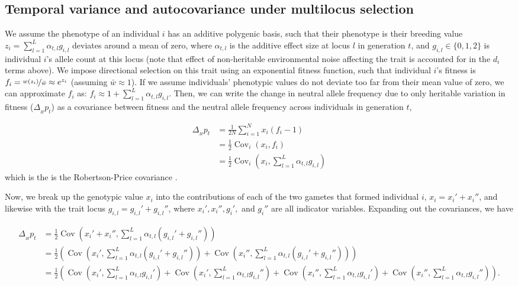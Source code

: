 \documentclass[11pt]{article}
\DeclareMathOperator{\cov}{Cov}
\begin{document}
\subsection{Temporal variance and autocovariance under multilocus selection}
\label{ap:multilocus}

We assume the phenotype of an individual $i$ has an additive polygenic basis,
such that their phenotype is their breeding value $z_i = \sum_{l=1}^L
\alpha_{t,l} g_{i,l}$ deviates around a mean of zero, where $\alpha_{t,l}$ is
the additive effect size at locus $l$ in generation $t$, and $g_{i,l} \in
\{0,1,2\}$ is individual $i$'s allele count at this locus (note that effect of
non-heritable environmental noise affecting the trait is accounted for in the
$d_i$ terms above). We impose directional selection on this trait using an
exponential fitness function, such that individual $i$'s fitness is $f_i =
\nicefrac{w(z_i)}{\bar{w}} \approx e^{z_i}$ (assuming $\bar{w} \approx 1$). If
we assume individuals' phenotypic values do not deviate too far from their mean
value of zero, we can approximate $f_i$ as: $f_i \approx 1 + \sum_{l=1}^L
\alpha_{t,l} g_{i,l}$. Then, we can write the change in neutral allele
frequency due to only heritable variation in fitness ($\Delta_{_H} p_t$) as a
covariance between fitness and the neutral allele frequency across individuals
in generation $t$, 

\begin{align}
  \Delta_{_H} p_t &= \frac{1}{2N} \sum_{i=1}^N x_i \left(f_i - 1\right) \\
                  &= \frac{1}{2} \cov_i(x_i, f_i) \\
                  &= \frac{1}{2} \cov_i(x_i, \sum_{l=1}^L \alpha_{t,l} g_{i,l})
\end{align}
%
which is the is the Robertson-Price covariance
\parencite{Price1970-si,Robertson1966-fs,Lynch1998-wl,Walsh2018-bt}.

Now, we break up the genotypic value $x_i$ into the contributions of each of
the two gametes that formed individual $i$, $x_i = x_i' + x_i''$, and likewise
with the trait locus $g_{i,l} = g_{i,l}' + g_{i,l}''$, where $x_i', x_i'',
g_i',$ and $g_i''$ are all indicator variables. Expanding out the covariances, we have

\begin{align}
  \Delta_{_H} p_t &= \frac{1}{2}\cov(x_i' + x_i'', \sum_{l=1}^L \alpha_{t,l} (g_{i,l}' + g_{i,l}'')) \nonumber \\
                &= \frac{1}{2}\left(\cov(x_i', \sum_{l=1}^L \alpha_{t,l} (g_{i,l}' + g_{i,l}'')) + \cov(x_i'', \sum_{l=1}^L \alpha_{t,l} (g_{i,l}' + g_{i,l}'')) \right) \nonumber \\ 
                &= \frac{1}{2} \left( \cov(x_i', \sum_{l=1}^L \alpha_{t,l} g_{i,l}') + \cov(x_i', \sum_{l=1}^L \alpha_{t,l} g_{i,l}'') + \cov(x_i'', \sum_{l=1}^L \alpha_{t,l} g_{i,l}') + \cov(x_i'', \sum_{l=1}^L \alpha_{t,l} g_{i,l}'') \right).
\end{align}
\end{document}
